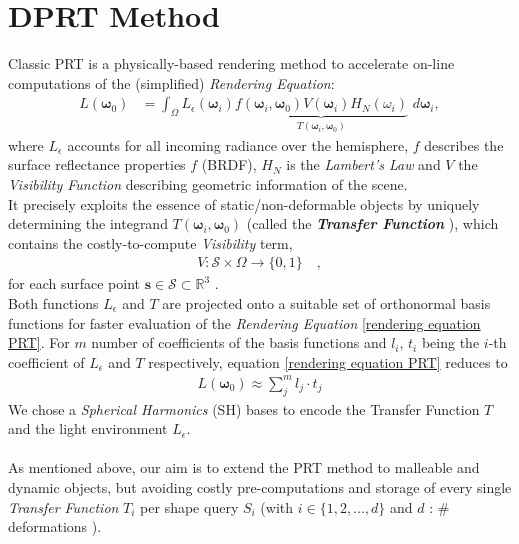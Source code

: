 \section{DPRT Method}
Classic PRT  is a physically-based rendering method to accelerate on-line computations of the (simplified) \textit{Rendering Equation}:
\begin{align}
L(\bm{\omega}_0 ) &= 
\int_{\Omega}   L_{\epsilon}(\bm{\omega}_i ) 
\underbrace{f(\bm{\omega}_i,\bm{\omega}_0) 
V(\bm{\omega}_i) H_N(\omega_i) }_{T(\bm{\omega}_i,\bm{\omega}_0) }
\,  \, d\bm{\omega}_i , 
\label{rendering equation PRT}
\end{align}
where $L_{\epsilon}$ accounts for all incoming radiance over the hemisphere, $f$  describes the surface reflectance properties $f$ (BRDF), $H_N$ is the \textit{Lambert's Law} and $V$ the \textit{Visibility Function} describing geometric information of the scene.\\
It precisely exploits the essence of static/non-deformable objects by uniquely determining the integrand $T(\bm{\omega}_i,\bm{\omega}_0)$ (called the \textbf{\textit{Transfer Function}} ), which contains the costly-to-compute  \textit{Visibility} term,
\begin{align*}
V :  \mathcal{S}  \times \Omega \rightarrow \{0,1\} \quad,
\end{align*}
for each surface point $\bm{s} \in \mathcal{S} \subset \mathbb{R}^3$ \cite{CohenBook}. 
\\
Both functions $L_{\epsilon} $ and $T$  are projected onto a suitable set of orthonormal basis functions for faster evaluation of the \textit{Rendering Equation} \ref{rendering equation PRT}. 
For $m$ number of coefficients of the basis functions and $l_i$, $t_i$ being the $i$-th coefficient of $L_{\epsilon} $ and $T$ respectively, equation \ref{rendering equation PRT} reduces to \cite{sloan2002precomputed} 
\begin{align}
L(\bm{\omega}_0 ) \approx \sum_{j}^{m} l_j \cdot t_j 
\label{Eq: Reduced Rendering Eq}
\end{align}
We chose a \textit{Spherical Harmonics} (SH) bases to encode the Transfer Function $T$ and the light environment $L_{\epsilon}$.
\\
\\
 As mentioned above, our aim is to extend the PRT method to malleable and dynamic objects, but avoiding costly pre-computations and storage of every single \textit{Transfer Function} $T_i$ per shape query $S_i$ (with $i \in \{1,2,... , d\}$ and $d$ : $\#$ deformations ). \\
